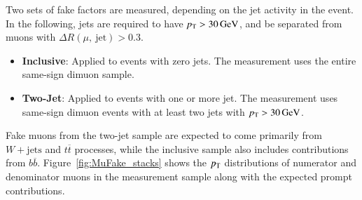 Two sets of fake factors are measured, depending on the jet activity in the event. In the following, jets are required to have $p_{\text{T}}>\SI{30}{\giga\electronvolt}$, and be separated from muons with $\Delta R(\mu,\ \mbox{jet})>0.3$. 
\begin{itemize}
  \item \textbf{Inclusive}: Applied to events with zero jets. The measurement uses the entire same-sign dimuon sample.
  \item \textbf{Two-Jet}: Applied to events with one or more jet. The measurement uses same-sign dimuon events with at least two jets with $p_{\text{T}}>\SI{30}{\giga\electronvolt}$. 
\end{itemize}
Fake muons from the two-jet sample are expected to come primarily from $W+\mbox{jets}$ and $t\overline{t}$ processes, while the inclusive sample also includes contributions from $b\overline{b}$. Figure~\ref{fig:MuFake_stacks} shows the $p_{\text{T}}$ distributions of numerator and denominator muons in the measurement sample along with the expected prompt
contributions. 
